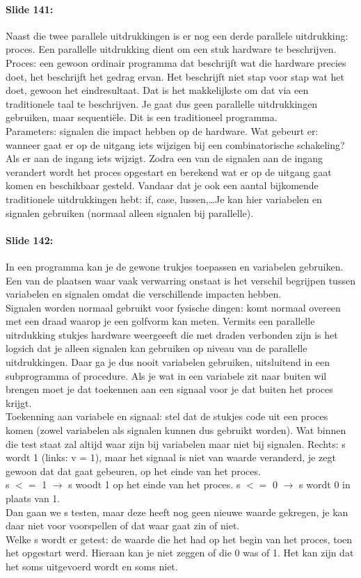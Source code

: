 \documentclass[10pt,a4paper]{book}
\begin{document}
\paragraph{Slide 141:} Naast die twee parallele uitdrukkingen is er nog een derde parallele uitdrukking: proces. Een parallelle uitdrukking dient om een stuk hardware te beschrijven. Proces: een gewoon ordinair programma dat beschrijft wat die hardware precies doet, het beschrijft het gedrag ervan. Het beschrijft niet stap voor stap wat het doet, gewoon het eindresultaat. Dat is het makkelijkste om dat via een traditionele taal te beschrijven. Je gaat dus geen parallelle uitdrukkingen gebruiken, maar sequenti\"ele. Dit is een traditioneel programma.\\
Parameters: signalen die impact hebben op de hardware. Wat gebeurt er: wanneer gaat er op de uitgang iets wijzigen bij een combinatorische schakeling? Als er aan de ingang iets wijzigt. Zodra een van de signalen aan de ingang verandert wordt het proces opgestart en berekend wat er op de uitgang gaat komen en beschikbaar gesteld. Vandaar dat je ook een aantal bijkomende traditionele uitdrukkingen hebt: if, case, lussen,\ldots Je kan hier variabelen en signalen gebruiken (normaal alleen signalen bij parallelle).

\paragraph{Slide 142:} In een programma kan je de gewone trukjes toepassen en variabelen gebruiken. Een van de plaatsen waar vaak verwarring onstaat is het verschil begrijpen tussen variabelen en signalen omdat die verschillende impacten hebben.\\
Signalen worden normaal gebruikt voor fysische dingen: komt normaal overeen met een draad waarop je een golfvorm kan meten. Vermits een parallelle uitrdukking stukjes hardware weergeeeft die met draden verbonden zijn is het logsich dat je alleen signalen kan gebruiken op niveau van de parallelle uitdrukkingen. Daar ga je dus nooit variabelen gebruiken, uitsluitend in een subprogramma of procedure. Als je wat in een variabele zit naar buiten wil brengen moet je dat toekennen aan een signaal voor je dat buiten het proces krijgt.\\
Toekenning aan variabele en signaal: stel dat de stukjes code uit een proces komen (zowel variabelen als signalen kunnen dus gebruikt worden). Wat binnen die test staat zal altijd waar zijn bij variabelen maar niet bij signalen. Rechts: s wordt 1 (links: v = 1), maar het signaal is niet van waarde veranderd, je zegt gewoon dat dat gaat gebeuren, op het einde van het proces.\\
s $<=$ 1 $\rightarrow$ s woodt 1 op het einde van het proces. s $<=$ 0 $\rightarrow$ s wordt 0 in plaats van 1.\\
Dan gaan we s testen, maar deze heeft nog geen nieuwe waarde gekregen, je kan daar niet voor voorspellen of dat waar gaat zin of niet.\\
Welke s wordt er getest: de waarde die het had op het begin van het proces, toen het opgestart werd. Hieraan kan je niet zeggen of die 0 was of 1. Het kan zijn dat het soms uitgevoerd wordt en soms niet.
\end{document}
